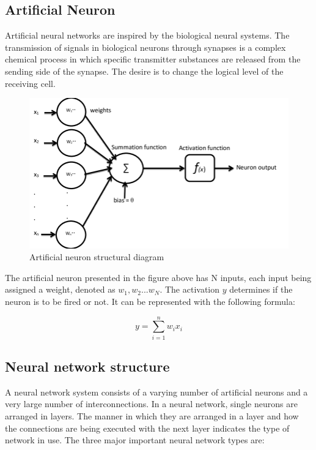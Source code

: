 
\subsection{Artificial Neuron}
Artificial neural networks are inspired by the biological neural systems. The transmission of signals in biological neurons through synapses is a complex chemical process in which specific transmitter substances are released from the sending side of the synapse. The desire is to change the logical level of the receiving cell. 

\begin{figure}[H]
    \centering
    \includegraphics[width=0.7\linewidth]{img/artificialNeuron.png}
    \caption{Artificial neuron structural diagram\cite{impactANN}}
    \label{fig:artificialNeuron}
\end{figure}

The artificial neuron presented in the figure above has N inputs, each input being assigned a weight, denoted as $w_1, w_2...w_N$. The activation $y$ determines if the neuron is to be fired or not. It can be represented with the following formula:

\begin{equation}
    y=\sum_{i=1}^nw_ix_i
\end{equation}

\subsection{Neural network structure}
A neural network system consists of a varying number of artificial neurons and a very large number of interconnections. In a neural network, single neurons are arranged in layers. The manner in which they are arranged in a layer and how the connections are being executed with the next layer indicates the type of network in use. The three major important neural network types are:

